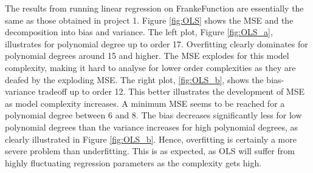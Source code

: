 \documentclass[a4paper]{article}
\begin{document}
	The results from running linear regression on FrankeFunction are essentially the same as those obtained in project 1. Figure \ref{fig:OLS} shows the MSE and the decomposition into bias and variance. The left plot, Figure \ref{fig:OLS_a}, illustrates for polynomial degree up to order 17. Overfitting clearly dominates for polynomial degrees around 15 and higher. The MSE explodes for this model complexity, making it hard to analyse for lower order complexities as they are deafed by the exploding MSE. 
	The right plot, \ref{fig:OLS_b}, shows the bias-variance tradeoff up to order 12. This better illustrates the development of MSE as model complexity increases. A minimum MSE seems to be reached for a polynomial degree between 6 and 8. The bias decreases significantly less for low polynomial degrees than the variance increases for high polynomial degrees, as clearly illustrated in Figure \ref{fig:OLS_b}. Hence, overfitting is certainly a more severe problem than underfitting. This is as expected, as OLS will suffer from highly fluctuating regression parameters as the complexity gets high. \\
	
\end{document}
